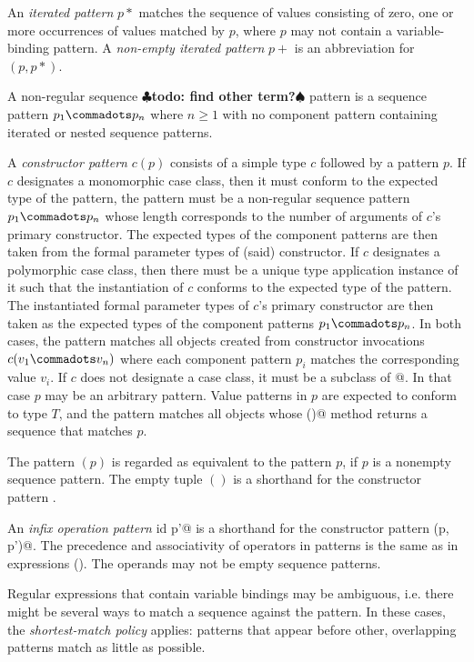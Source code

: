 \documentclass[11pt]{report}
\renewcommand{\todo}[1]{{$\clubsuit$\bf todo: #1$\spadesuit$}}
\begin{document}
An {\em iterated pattern} $p*$ matches the sequence of values
consisting of zero, one or more occurrences of values matched by $p$,
where $p$ may not contain a variable-binding pattern. A {\em non-empty
iterated pattern} $p+$ is an abbreviation for $(p,p*)$. 

A non-regular sequence \todo{find other term?}
pattern is a sequence pattern $p_1 \commadots p_n$ 
where $n \geq 1$ with no component pattern containing iterated or nested
sequence patterns.

A {\em constructor pattern} $c ( p )$ consists of a simple type $c$
followed by a pattern $p$.  If $c$ designates a monomorphic case
class, then it must conform to the expected type of the pattern, the
pattern must be a non-regular sequence pattern $p_1 \commadots p_n$
whose length corresponds to the number of arguments of $c$'s primary
constructor. The expected types of the component patterns are then
taken from the formal parameter types of (said) constructor.  If $c$
designates a polymorphic case class, then there must be a unique type
application instance of it such that the instantiation of $c$ conforms
to the expected type of the pattern. The instantiated formal parameter
types of $c$'s primary constructor are then taken as the expected
types of the component patterns $p_1\commadots p_n$.  In both cases,
the pattern matches all objects created from constructor invocations
$c(v_1 \commadots v_n)$ where each component pattern $p_i$ matches the
corresponding value $v_i$. If $c$ does not designate a case class, it
must be a subclass of \verb@Seq[ T ]@. In that case $p$ may be an
arbitrary pattern. Value patterns in $p$ are expected to conform to
type $T$, and the pattern matches all objects whose \verb@elements()@
method returns a sequence that matches $p$.

The pattern $(p)$ is regarded as equivalent to the pattern $p$, if $p$
is a nonempty sequence pattern. The empty tuple $()$ is a shorthand
for the constructor pattern \verb@Unit@.

An {\em infix operation pattern} \verb@p id p'@ is a shorthand for the
constructor pattern \verb@id(p, p')@.  The precedence and
associativity of operators in patterns is the same as in expressions
(). The operands may not be empty sequence
patterns.

Regular expressions that contain variable bindings may be ambiguous,
i.e. there might be several ways to match a sequence against the
pattern. In these cases, the \emph{shortest-match policy} applies:
patterns that appear before other, overlapping patterns match
as little as possible.
\end{document}
